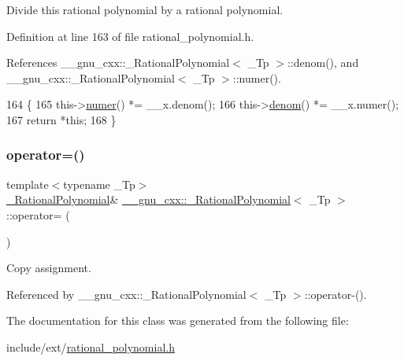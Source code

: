 Divide this rational polynomial by a rational polynomial. 

Definition at line 163 of file rational\+\_\+polynomial.\+h.



References \+\_\+\+\_\+gnu\+\_\+cxx\+::\+\_\+\+Rational\+Polynomial$<$ \+\_\+\+Tp $>$\+::denom(), and \+\_\+\+\_\+gnu\+\_\+cxx\+::\+\_\+\+Rational\+Polynomial$<$ \+\_\+\+Tp $>$\+::numer().


\begin{DoxyCode}
164       \{
165         this->\hyperlink{class____gnu__cxx_1_1__RationalPolynomial_aa42ac2f6c2368cae05ba3a3cebf0fa24}{numer}() *= \_\_x.denom();
166         this->\hyperlink{class____gnu__cxx_1_1__RationalPolynomial_a05e84913ccfddcf6fcbfe623cb56c937}{denom}() *= \_\_x.numer();
167         \textcolor{keywordflow}{return} *\textcolor{keyword}{this};
168       \}
\end{DoxyCode}
\mbox{\label{class____gnu__cxx_1_1__RationalPolynomial_afa1efd00dfffcf6851bac3da7ba399dc}} 
\subsubsection{\texorpdfstring{operator=()}{operator=()}}
{\footnotesize\ttfamily template$<$typename \+\_\+\+Tp$>$ \\
\hyperlink{class____gnu__cxx_1_1__RationalPolynomial}{\+\_\+\+Rational\+Polynomial}\& \hyperlink{class____gnu__cxx_1_1__RationalPolynomial}{\+\_\+\+\_\+gnu\+\_\+cxx\+::\+\_\+\+Rational\+Polynomial}$<$ \+\_\+\+Tp $>$\+::operator= (\begin{DoxyParamCaption}\item[{const \hyperlink{class____gnu__cxx_1_1__RationalPolynomial}{\+\_\+\+Rational\+Polynomial}$<$ \+\_\+\+Tp $>$ \&}]{ }\end{DoxyParamCaption})\hspace{0.3cm}{\ttfamily [default]}}

Copy assignment. 

Referenced by \+\_\+\+\_\+gnu\+\_\+cxx\+::\+\_\+\+Rational\+Polynomial$<$ \+\_\+\+Tp $>$\+::operator-\/().



The documentation for this class was generated from the following file\+:\begin{DoxyCompactItemize}
\item 
include/ext/\hyperlink{rational__polynomial_8h}{rational\+\_\+polynomial.\+h}\end{DoxyCompactItemize}
